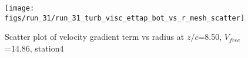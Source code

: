 \begin{figure}[H]
\centering
\texttt{[image: figs/run\_31/run\_31\_turb\_visc\_ettap\_bot\_vs\_r\_mesh\_scatter]}
\caption{Scatter plot of velocity gradient term vs radius at $z/c$=8.50, $V_{free}$=14.86, station4}
\label{fig:run_31_turb_visc_ettap_bot_vs_r_mesh_scatter}
\end{figure}


